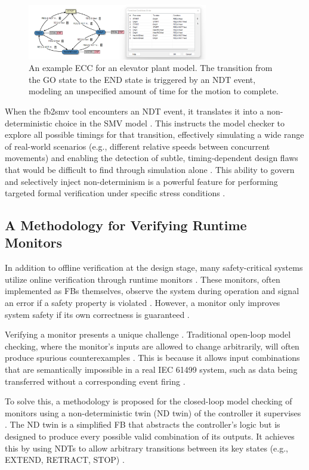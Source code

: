 \begin{figure}[h]
\centering
\includegraphics[width=0.7\textwidth]{chapters/images/chapter2/ECC-moniteur.png}
\caption{An example ECC for an elevator plant model. The transition from the GO state to the END state is triggered by an NDT event, modeling an unspecified amount of time for the motion to complete.}
\label{fig:ecc_ndt}
\end{figure}

When the fb2smv tool encounters an NDT event, it translates it into a non-deterministic choice in the SMV model . This instructs the model checker to explore all possible timings for that transition, effectively simulating a wide range of real-world scenarios (e.g., different relative speeds between concurrent movements) and enabling the detection of subtle, timing-dependent design flaws that would be difficult to find through simulation alone . This ability to govern and selectively inject non-determinism is a powerful feature for performing targeted formal verification under specific stress conditions .

\subsection{A Methodology for Verifying Runtime Monitors}

In addition to offline verification at the design stage, many safety-critical systems utilize online verification through runtime monitors . These monitors, often implemented as FBs themselves, observe the system during operation and signal an error if a safety property is violated . However, a monitor only improves system safety if its own correctness is guaranteed .

Verifying a monitor presents a unique challenge . Traditional open-loop model checking, where the monitor's inputs are allowed to change arbitrarily, will often produce spurious counterexamples . This is because it allows input combinations that are semantically impossible in a real IEC 61499 system, such as data being transferred without a corresponding event firing .

To solve this, a methodology is proposed for the closed-loop model checking of monitors using a non-deterministic twin (ND twin) of the controller it supervises . The ND twin is a simplified FB that abstracts the controller's logic but is designed to produce every possible valid combination of its outputs. It achieves this by using NDTs to allow arbitrary transitions between its key states (e.g., EXTEND, RETRACT, STOP) .

